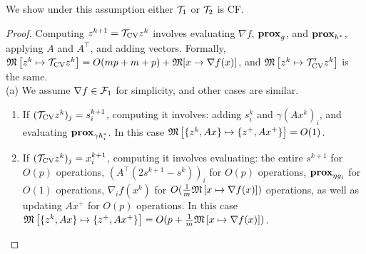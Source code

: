 {{{We show under this assumption either ${\mathcal{T}}_1$ or ${\mathcal{T}}_2$ is CF. }
\begin{proof}
Computing $z^{k+1}={{\mathcal{T}}_{\textnormal{CV}}} z^k$ involves evaluating $\nabla f$, $\mathbf{prox}_g$, and $\mathbf{prox}_{h^*}$, applying $A$ and $A^\top$, and adding vectors.
Formally, $\mathfrak{M}\left[{z^k}\mapsto {{{\mathcal{T}}_{\textnormal{CV}}}z^k}\right]=O(mp+m+p)+\mathfrak{M}[x\to\nabla f(x)]$, and $\mathfrak{M}\left[{z^k}\mapsto {{\mathcal{T}}'_{\textnormal{CV}}z^k}\right]$ is the same.\\
(a) We assume $\nabla f\in{\mathcal{F}}_1$ for simplicity, and other cases are similar.
\begin{enumerate}
\item If $({{\mathcal{T}}_{\textnormal{CV}}} z^k)_j=s^{k+1}_i$, computing it involves: adding $s^k_i$ and $\gamma (Ax^k)_i$, and evaluating $\mathbf{prox}_{\gamma h^*_i}$. In this case $\mathfrak{M}\left[{\{z^k,Ax\}}\mapsto {\{z^+,Ax^+\}}\right]=O(1)$. 
\item If $({{\mathcal{T}}_{\textnormal{CV}}} z^k)_j=x^{k+1}_i$, computing it involves evaluating: the entire $s^{k+1}$ for $O(p)$ operations, $(A^\top(2s^{k+1}-s^k))_i$ for $O(p)$ operations, $\mathbf{prox}_{\eta g_i}$ for $O(1)$ operations, $\nabla_i f({x}^{k})$ for $O(\frac{1}{m}\mathfrak{M}\left[{x}\mapsto {\nabla f(x)}\right])$ operations, as well as updating $Ax^+$ for $O(p)$ operations.
In this case\\ $\mathfrak{M}\left[{\{z^k,Ax\}}\mapsto {\{z^+,Ax^+\}}\right]=O(p+\frac{1}{m}\mathfrak{M}\left[{x}\mapsto {\nabla f(x)}\right])$.
\end{enumerate}

\end{proof}}}

